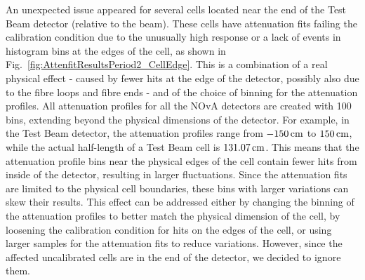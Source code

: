 An unexpected issue appeared for several cells located near the end of the Test Beam detector (relative to the beam). These cells have attenuation fits failing the calibration condition due to the unusually high response or a lack of events in histogram bins at the edges of the cell, as shown in Fig.~\ref{fig:AttenfitResultsPeriod2_CellEdge}. This is a combination of a real physical effect - caused by fewer hits at the edge of the detector, possibly also due to the fibre loops and fibre ends - and of the choice of binning for the attenuation profiles. All attenuation profiles for all the \gls{NOvA} detectors are created with 100 bins, extending beyond the physical dimensions of the detector. For example, in the Test Beam detector, the attenuation profiles range from $\unit[-150]{cm}$ to $\unit[150]{cm}$, while the actual half-length of a Test Beam cell is $\unit[131.07]{cm}$. This means that the attenuation profile bins near the physical edges of the cell contain fewer hits from inside of the detector, resulting in larger fluctuations. Since the attenuation fits are limited to the physical cell boundaries, these bins with larger variations can skew their results. This effect can be addressed either by changing the binning of the attenuation profiles to better match the physical dimension of the cell, by loosening the calibration condition for hits on the edges of the cell, or using larger samples for the attenuation fits to reduce variations. However, since the affected uncalibrated cells are in the end of the detector, we decided to ignore them.


